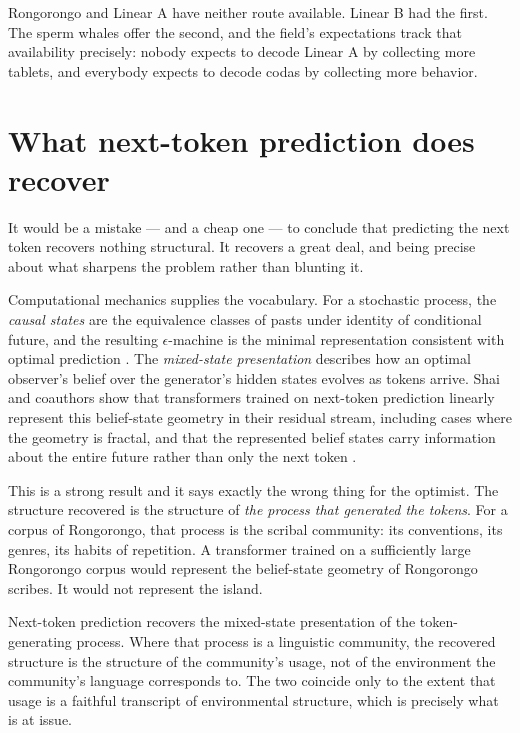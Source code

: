 \noindent
Rongorongo and Linear A have neither route available.
Linear B had the first.
The sperm whales offer the second, and the field's expectations
track that availability precisely: nobody expects to decode Linear
A by collecting more tablets, and everybody expects to decode codas
by collecting more behavior.

\section{What next-token prediction does recover}
\label{sec:recovers}

It would be a mistake --- and a cheap one --- to conclude that
predicting the next token recovers nothing structural.
It recovers a great deal, and being precise about what sharpens the
problem rather than blunting it.

Computational mechanics supplies the vocabulary.
For a stochastic process, the \emph{causal states} are the
equivalence classes of pasts under identity of conditional future,
and the resulting $\epsilon$-machine is the minimal representation
consistent with optimal prediction \cite{shalizi2001}.
The \emph{mixed-state presentation} describes how an optimal
observer's belief over the generator's hidden states evolves as
tokens arrive.
Shai and coauthors show that transformers trained on next-token
prediction linearly represent this belief-state geometry in their
residual stream, including cases where the geometry is fractal, and
that the represented belief states carry information about the
entire future rather than only the next token \cite{shai2024}.

This is a strong result and it says exactly the wrong thing for the
optimist.
The structure recovered is the structure of \emph{the process that
generated the tokens}.
For a corpus of Rongorongo, that process is the scribal community:
its conventions, its genres, its habits of repetition.
A transformer trained on a sufficiently large Rongorongo corpus
would represent the belief-state geometry of Rongorongo scribes.
It would not represent the island.

\begin{observation}
\label{obs:generator}
Next-token prediction recovers the mixed-state presentation of the
token-generating process.
Where that process is a linguistic community, the recovered
structure is the structure of the community's usage, not of the
environment the community's language corresponds to.
The two coincide only to the extent that usage is a faithful
transcript of environmental structure, which is precisely what is
at issue.
\end{observation}

